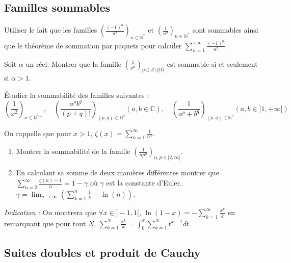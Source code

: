 \subsection{Familles sommables}

\begin{exercice}
Utiliser le fait que les familles $(\frac{(-1)^{n}}{n^{2}})_{n\in \mathbb{N}^{*}}$ et $(\frac{1}{n^{2}})_{n\in \mathbb{N}^{*}}$ sont sommables ainsi que le théorème de sommation par paquets pour calculer $\sum_{n=1}^{+\infty}\frac{(-1)^{n}}{n^{2}}$.
\end{exercice}

\begin{exercice}
Soit $\alpha$ un réel. Montrer que la famille $(\frac{1}{p^{\alpha}})_{p\in \mathbb{Z}\setminus\{0\}}$ est sommable si et seulement si $\alpha>1$.
\end{exercice}

\begin{exercice}
Étudier la sommabilité des familles suivantes :
$$ \left(\frac{1}{x^{2}}\right)_{x\in \mathbb{Q}^{*+}}, \quad \left(\frac{a^{p}b^{q}}{(p+q)!}\right)_{(p,q)\in \mathbb{N}^{2}}(a,b\in\mathbb{C}), \quad \left(\frac{1}{a^{p}+b^{q}}\right)_{(p,q)\in \mathbb{N}^{2}}(a,b\in]1,+\infty[) $$
\end{exercice}

\begin{exercice}
On rappelle que pour $x>1$, $\zeta(x)=\sum_{n=1}^{\infty}\frac{1}{n^{x}}$.
\begin{enumerate}
    \item Montrer la sommabilité de la famille $(\frac{1}{np^{n}})_{n,p\in[2,\infty[}$.
    \item En calculant sa somme de deux manières différentes montrer que $\sum_{n=2}^{\infty}\frac{\zeta(n)-1}{n}=1-\gamma$ où $\gamma$ est la constante d'Euler, $\gamma=\lim_{n\rightarrow\infty}(\sum_{k=1}^{n}\frac{1}{k}-\ln(n))$.
\end{enumerate}
\textit{Indication :} On montrera que $\forall x\in]-1,1[$, $\ln(1-x)=-\sum_{k=1}^{\infty}\frac{x^{k}}{k}$ en remarquant que pour tout $N$, $\sum_{k=1}^{N}\frac{x^{k}}{k}=\int_{0}^{x}\sum_{k=1}^{N}t^{k-1} dt$.
\end{exercice}

\subsection{Suites doubles et produit de Cauchy}

